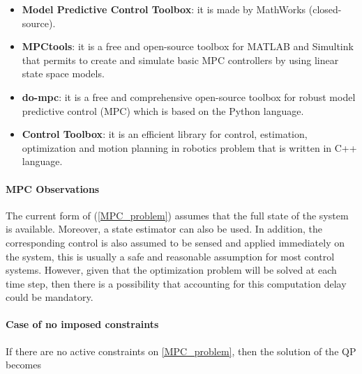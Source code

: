 \documentclass{thesisreport}
\begin{document}
  \begin{itemize}
  	\item \textbf{Model Predictive Control Toolbox}\footnotemark : it is made by MathWorks (closed-source).
  	\item \textbf{MPCtools}\footnotemark : it is a free and open-source toolbox for MATLAB and Simultink that  permits to create and simulate basic MPC controllers by using linear state space models.
  	\item \textbf{do-mpc}\footnotemark : it is a free and comprehensive open-source toolbox for robust model predictive control (MPC) which is based on the Python language.
  	\item \textbf{Control Toolbox}\footnotemark : it is an efficient library for control, estimation, optimization and motion planning in robotics problem that is written in C++ language.
  \end{itemize}
  






\paragraph{MPC Observations} The current form of (\ref{MPC_problem}) assumes that the full state of the system is available. Moreover, a state estimator can also be used. In addition, the corresponding control is also assumed to be sensed and applied immediately on the system, this is usually a safe and reasonable assumption for most control systems. However, given that the optimization problem will be solved at each time step, then there is a possibility that accounting for this computation delay could be mandatory.

\newpage

\paragraph{Case of no imposed constraints} 
If there are no active constraints on \ref{MPC_problem}, then the solution of the QP becomes
\end{document}
